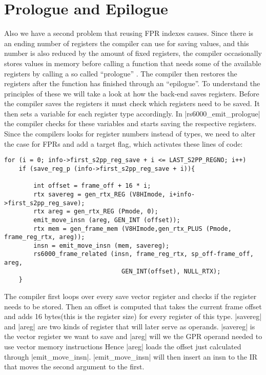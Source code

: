 \section{Prologue and Epilogue}
Also we have a second problem that reusing FPR indexes causes.
Since there is an ending number of registers the compiler can use for saving values, and this number is also reduced by the amount of fixed registers, the compiler occasionally stores values in memory before calling a function that needs some of the available registers by calling a so called ``prologue'' \citep{GCCint:funcentry}.
The compiler then restores the registers after the function has finished through an ``epilogue''.
To understand the principles of these we will take a look at how the back-end saves registers.
Before the compiler saves the registers it must check which registers need to be saved.
It then sets a variable for each register type accordingly.
In |rs6000_emit_prologue| the compiler checks for these variables and starts saving the respective registers.
Since the compilers looks for register numbers instead of types, we need to alter the case for FPRs and add a target flag, which activates these lines of code:
\begin{lstlisting}
for (i = 0; info->first_s2pp_reg_save + i <= LAST_S2PP_REGNO; i++)
    if (save_reg_p (info->first_s2pp_reg_save + i)){

        int offset = frame_off + 16 * i;
        rtx savereg = gen_rtx_REG (V8HImode, i+info->first_s2pp_reg_save);
        rtx areg = gen_rtx_REG (Pmode, 0);
        emit_move_insn (areg, GEN_INT (offset));
        rtx mem = gen_frame_mem (V8HImode,gen_rtx_PLUS (Pmode, frame_reg_rtx, areg));
        insn = emit_move_insn (mem, savereg);
        rs6000_frame_related (insn, frame_reg_rtx, sp_off-frame_off, areg,
                                GEN_INT(offset), NULL_RTX);
    }
\end{lstlisting}
The compiler first loops over every save vector register and checks if the register needs to be stored.
Then an offset is computed that takes the current frame offset and adds 16 bytes(this is the register size) for every register of this type.
|savereg| and |areg| are two kinds of register that will later serve as operands.
|savereg| is the vector register we want to save and |areg| will we the GPR operand needed to use vector memory instructions
Hence |areg| loads the offset just calculated through |emit_move_insn|.
|emit_move_insn| will then insert an insn to the IR that moves the second argument to the first.

